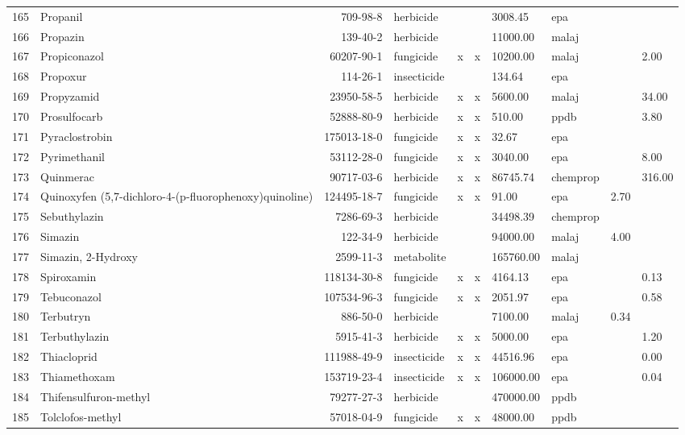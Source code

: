 \begin{longtable}{lp{3cm}rlp{0.5cm}p{0.5cm}p{1.5cm}p{1cm}p{1cm}p{1cm}}
  165 & Propanil & 709-98-8 & herbicide &  &  & 3008.45 & epa &  &  \\ 
  166 & Propazin & 139-40-2 & herbicide &  &  & 11000.00 & malaj &  &  \\ 
  167 & Propiconazol & 60207-90-1 & fungicide & x & x & 10200.00 & malaj &  & 2.00 \\ 
  168 & Propoxur & 114-26-1 & insecticide &  &  & 134.64 & epa &  &  \\ 
  169 & Propyzamid & 23950-58-5 & herbicide & x & x & 5600.00 & malaj &  & 34.00 \\ 
  170 & Prosulfocarb & 52888-80-9 & herbicide & x & x & 510.00 & ppdb &  & 3.80 \\ 
  171 & Pyraclostrobin & 175013-18-0 & fungicide & x & x & 32.67 & epa &  &  \\ 
  172 & Pyrimethanil & 53112-28-0 & fungicide & x & x & 3040.00 & epa &  & 8.00 \\ 
  173 & Quinmerac & 90717-03-6 & herbicide & x & x & 86745.74 & chemprop &  & 316.00 \\ 
  174 & Quinoxyfen (5,7-dichloro-4-(p-fluorophenoxy)quinoline) & 124495-18-7 & fungicide & x & x & 91.00 & epa & 2.70 &  \\ 
  175 & Sebuthylazin & 7286-69-3 & herbicide &  &  & 34498.39 & chemprop &  &  \\ 
  176 & Simazin & 122-34-9 & herbicide &  &  & 94000.00 & malaj & 4.00 &  \\ 
  177 & Simazin, 2-Hydroxy & 2599-11-3 & metabolite &  &  & 165760.00 & malaj &  &  \\ 
  178 & Spiroxamin & 118134-30-8 & fungicide & x & x & 4164.13 & epa &  & 0.13 \\ 
  179 & Tebuconazol & 107534-96-3 & fungicide & x & x & 2051.97 & epa &  & 0.58 \\ 
  180 & Terbutryn & 886-50-0 & herbicide &  &  & 7100.00 & malaj & 0.34 &  \\ 
  181 & Terbuthylazin & 5915-41-3 & herbicide & x & x & 5000.00 & epa &  & 1.20 \\ 
  182 & Thiacloprid & 111988-49-9 & insecticide & x & x & 44516.96 & epa &  & 0.00 \\ 
  183 & Thiamethoxam & 153719-23-4 & insecticide & x & x & 106000.00 & epa &  & 0.04 \\ 
  184 & Thifensulfuron-methyl & 79277-27-3 & herbicide &  &  & 470000.00 & ppdb &  &  \\ 
  185 & Tolclofos-methyl & 57018-04-9 & fungicide & x & x & 48000.00 & ppdb &  &  \\ 

\end{longtable}
